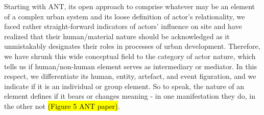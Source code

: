 \documentclass[11pt]{report}
\begin{document}
Starting with ANT, its open approach to comprise whatever may be an element of a complex urban system and its loose definition of actor’s relationality, we faced rather straight-forward indicators of actors’ influence on site and have realized that their human/material nature should be acknowledged as it unmistakably designates their roles in processes of urban development.
Therefore, we have shrunk this wide conceptual field to the category of actor nature, which tells us if human/non-human element serves as intermediary or mediator. In this respect, we differentiate its human, entity, artefact, and event figuration, and we indicate if it is an individual or group element. So to speak, the nature of an element defines if it bears or changes meaning - in one manifestation they do, in the other not \hl{(Figure 5 ANT paper)}.
\end{document}
